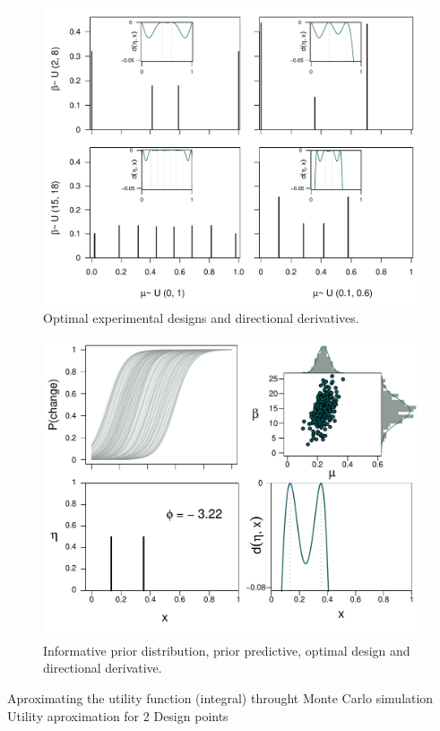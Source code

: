 \documentclass[preprint,review,12pt]{elsarticle}
\begin{document}
\begin{figure}
\includegraphics[width=\textwidth]{Support_detadx.pdf}
\caption{Optimal experimental designs and directional derivatives.}
\label{fig:detadx}
\end{figure}

\begin{figure}
\includegraphics[width=\textwidth]{Joint_Normal.pdf}
\caption{Informative prior distribution, prior predictive, optimal design and directional derivative.}
\label{fig:jn}
\end{figure}

Aproximating the utility function (integral) throught Monte Carlo simulation 
Utility aproximation for 2 Design points 
\end{document}
